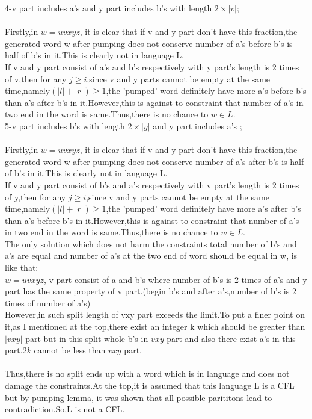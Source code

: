 \documentclass[a4paper,12pt]{article}
\begin{document}
\begin{tcolorbox}
4-v part includes a's and y part includes b's with length $2\times |v|$;\\\\
Firstly,in $w=uvxyz$, it is clear that if v and y part don't have this fraction,the generated word w after pumping does not conserve number of a's before b's is half of b's in it.This is clearly not in language L.\\
If v and y part consist of  a's and b's respectively with y part's length is 2 times of v,then for any $j\geq i$,since v and y parts cannot be empty at the same time,namely$(|l|+|r|)\geq 1$,the 'pumped' word definitely have more a's before b's than a's after b's in it.However,this is against to constraint that number of a's in two end in the word is same.Thus,there is no chance to $w\in L$.\\

5-v part includes b's with length $2\times |y|$ and y part includes a's ;\\\\
Firstly,in $w=uvxyz$, it is clear that if v and y part don't have this fraction,the generated word w after pumping does not conserve number of a's after b's is half of b's in it.This is clearly not in language L.\\
If v and y part consist of  b's and a's respectively with v part's length is 2 times of y,then for any $j\geq i$,since v and y parts cannot be empty at the same time,namely$(|l|+|r|)\geq 1$,the 'pumped' word definitely have more a's after b's than a's before b's in it.However,this is against to constraint that number of a's in two end in the word is same.Thus,there is no chance to $w\in L$.\\



The only solution which does not harm the constraints total number of b's and a's are equal and number of a's at the two end of word should be equal in w, is like that:\\
$w=uvxyz$, v part consist of a and b's where number of b's is 2 times of a's and y part has the same property of v part.(begin b's and after a's,number of b's is 2 times of number of a's)\\However,in such split length of vxy part exceeds the limit.To put a finer point on it,as I mentioned at the top,there exist an integer k which should be  greater than $|vxy|$ part but in this split whole b's in $vxy$ part and also there exist a's in this part.$2k$ cannot be less than $vxy$ part.\\\\

Thus,there is no split ends up with a word which is in language and does not damage the constraints.At the top,it is assumed that this language L is a CFL but by pumping lemma, it was shown  that all possible parititons lead to contradiction.So,L is not a CFL.\\

\end{tcolorbox}
\end{document}
